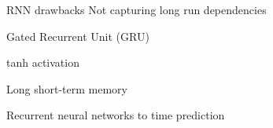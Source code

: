\documentclass{beamer}
\begin{document}
\begin{frame}{RNN drawbacks}
Not capturing long run dependencies
\end{frame}


\begin{frame}{Gated Recurrent Unit (GRU)}


\end{frame}



\begin{frame}{tanh activation}


\end{frame}

\begin{frame}{Long short-term memory}

\end{frame}



\begin{frame}{Recurrent neural networks to time prediction}

\end{frame}
\end{document}
